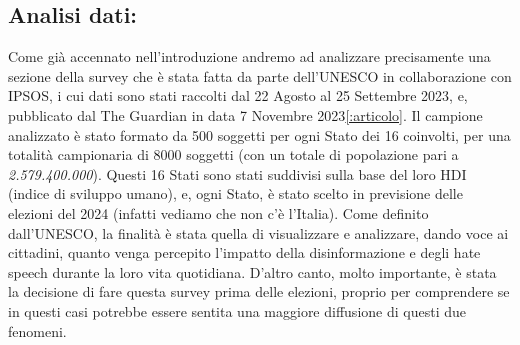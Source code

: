 \documentclass{article}
\begin{document}
\centering\newpage\subsection{Analisi dati:}
\begin{justify}    
Come già accennato nell'introduzione andremo ad analizzare precisamente una sezione della survey che è stata fatta da parte dell'UNESCO in collaborazione con IPSOS, i cui dati sono stati raccolti dal 22 Agosto al 25 Settembre 2023, e, pubblicato dal The Guardian in data 7 Novembre 2023\ref{:articolo}. \citep{Unesco}
Il campione analizzato è stato formato da 500 soggetti per ogni Stato dei 16 coinvolti, per una totalità campionaria di 8000 soggetti (con un totale di popolazione pari a \textit{2.579.400.000}).
Questi 16 Stati sono stati suddivisi sulla base del loro HDI (indice di sviluppo umano), e, ogni Stato, è stato scelto in previsione delle elezioni del 2024 (infatti vediamo che non c'è l'Italia).
Come definito dall'UNESCO, la finalità è stata quella di visualizzare e analizzare, dando voce ai cittadini, quanto venga percepito l'impatto della disinformazione e degli hate speech durante la loro vita quotidiana. D'altro canto, molto importante, è stata la decisione di fare questa survey prima delle elezioni, proprio per comprendere se in questi casi potrebbe essere sentita una maggiore diffusione di questi due fenomeni.
\end{justify}
\end{document}
